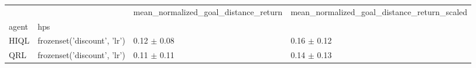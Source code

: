 \begin{tabular}{llll}
\toprule
 &  & mean_normalized_goal_distance_return & mean_normalized_goal_distance_return_scaled \\
agent & hps &  &  \\
\midrule
HIQL & frozenset({'discount', 'lr'}) & 0.12 $\pm$ 0.08 & 0.16 $\pm$ 0.12 \\
\cline{1-4}
QRL & frozenset({'discount', 'lr'}) & 0.11 $\pm$ 0.11 & 0.14 $\pm$ 0.13 \\
\cline{1-4}
\bottomrule
\end{tabular}
